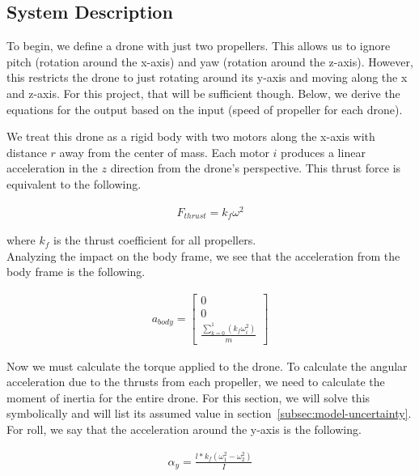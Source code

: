     \subsection{System Description}\label{subsec:system-description}

    To begin, we define a drone with just two propellers.
    This allows us to ignore pitch (rotation around the x-axis) and yaw (rotation around the z-axis).
    However, this restricts the drone to just rotating around its y-axis and moving along the x and z-axis.
    For this project, that will be sufficient though.
    Below, we derive the equations for the output based on the input (speed of propeller for each drone).

    We treat this drone as a rigid body with two motors along the x-axis with distance $r$ away from the center of mass.
    Each motor $i$ produces a linear acceleration in the $z$ direction from the drone's perspective.
    This thrust force is equivalent to the following.

    \begin{align}
        F_{thrust} = k_f\omega^2
    \end{align}

    where $k_f$ is the thrust coefficient for all propellers.\\

    Analyzing the impact on the body frame, we see that the acceleration from the body
    frame is the following.

    \begin{align}
        a_{body} = \begin{bmatrix} 0 \\ 0 \\ \frac{\sum_{k=0}^1(k_f\omega_i^2)}{m} \end{bmatrix}
    \end{align}

    Now we must calculate the torque applied to the drone.
    To calculate the angular acceleration due to the thrusts from each propeller,
    we need to calculate the moment of inertia for the entire drone.
    For this section, we will solve this symbolically and will list its assumed value in section~\ref{subsec:model-uncertainty}.
    For roll, we say that the acceleration around the y-axis is the following.

    \begin{align}
        \alpha_y = \frac{l*k_f(\omega_1^2 - \omega_2^2)}{I}
    \end{align}

